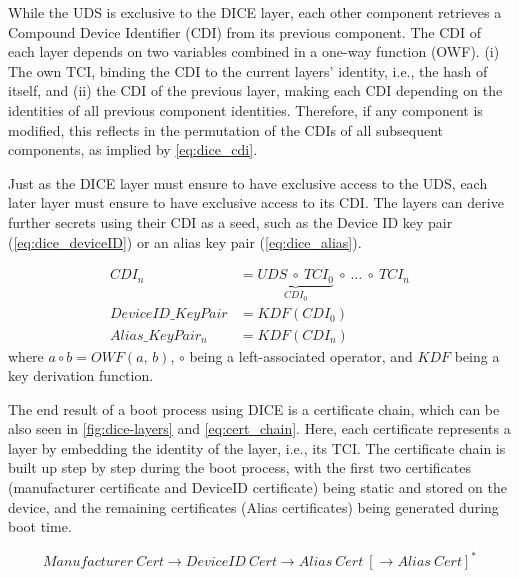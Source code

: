 
While the UDS is exclusive to the DICE layer, each other component retrieves a Compound Device Identifier (CDI) from its previous component.
The CDI of each layer depends on two variables combined in a one-way function (OWF).
(i) The own TCI, binding the CDI to the current layers' identity, i.e., the hash of itself, and (ii) the CDI of the previous layer, making each CDI depending on the identities of all previous component identities.
Therefore, if any component is modified, this reflects in the permutation of the CDIs of all subsequent components, as implied by \autoref{eq:dice_cdi}.


Just as the DICE layer must ensure to have exclusive access to the UDS, each later layer must ensure to have exclusive access to its CDI.
The layers can derive further secrets using their CDI as a seed, such as the Device ID key pair (\autoref{eq:dice_deviceID}) or an alias key pair (\autoref{eq:dice_alias}).

\noindent
\begin{minipage}{\linewidth}
\begin{align}
  \label{eq:dice_cdi}
  CDI_n &= \underbrace{UDS\ \circ\ TCI_0}_{CDI_0}\ \circ\ \ldots\ \circ\ TCI_n\\
  \label{eq:dice_deviceID}
  DeviceID\_KeyPair &= KDF(CDI_0)\\
  \label{eq:dice_alias}
  Alias\_KeyPair_n  &= KDF(CDI_n)
\end{align}
where $a \circ b = OWF(a,\,b)$, $\circ$ being a left-associated operator, and $KDF$ being a key derivation function.
\end{minipage}
\baselineskip


The end result of a boot process using DICE is a certificate chain, which can be also seen in \autoref{fig:dice-layers} and \autoref{eq:cert_chain}.
Here, each certificate represents a layer by embedding the identity of the layer, i.e., its TCI.
The certificate chain is built up step by step during the boot process, with the first two certificates (manufacturer certificate and DeviceID certificate) being static and stored on the device, and the remaining certificates (Alias certificates) being generated during boot time.

\begin{equation}
  \label{eq:cert_chain}
  Manufacturer\ Cert \rightarrow DeviceID\ Cert \rightarrow Alias\ Cert\ [\rightarrow Alias\ Cert]^*
\end{equation}

